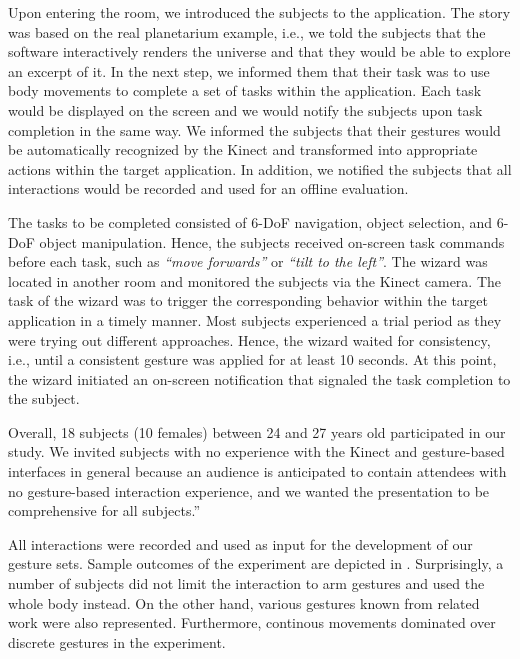 \documentclass{sigchi}
\begin{document}
Upon entering the room, we introduced the subjects to the application. The story was based on the real planetarium example, i.e., we told the subjects that the software interactively renders the universe and that they would be able to explore an excerpt of it. In the next step, we informed them that their task was to use body movements to complete a set of tasks within the application. Each task would be displayed on the screen and we would notify the subjects upon task completion in the same way. We informed the subjects that their gestures would be automatically recognized by the Kinect and transformed into appropriate actions within the target application. In addition, we notified the subjects that all interactions would be recorded and used for an offline evaluation.

The tasks to be completed consisted of 6-DoF navigation, object selection, and 6-DoF object manipulation. Hence, the subjects received on-screen task commands before each task, such as \textit{``move forwards''} or \textit{``tilt to the left''}. The wizard was located in another room and monitored the subjects via the Kinect camera. The task of the wizard was to trigger the corresponding behavior within the target application in a timely manner.  Most subjects experienced a trial period as they were trying out different approaches. Hence, the wizard waited for consistency, i.e., until a consistent gesture was applied for at least 10 seconds. At this point, the wizard initiated an on-screen notification that signaled the task completion to the subject.

Overall, 18 subjects (10 females) between 24 and 27 years old participated in our study. We invited subjects with no experience with the Kinect and gesture-based interfaces in general because an audience is anticipated to contain attendees with no gesture-based interaction experience, and we wanted the presentation to be comprehensive for all subjects.”

All interactions were recorded and used as input for the development of our gesture sets. Sample outcomes of the experiment are depicted in . Surprisingly, a number of subjects did not limit the interaction to arm gestures and used the whole body instead. On the other hand, various gestures known from related work were also represented. Furthermore, continous movements dominated over discrete gestures in the experiment.
\end{document}
